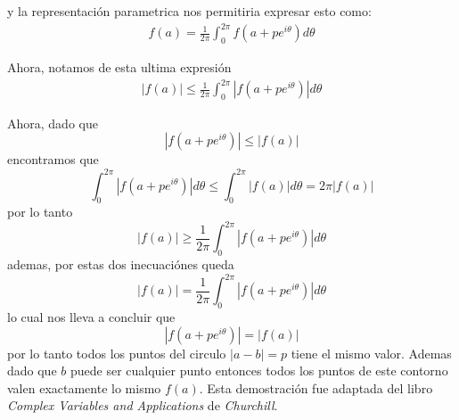 \documentclass[12pt]{exam}
\begin{document}
y la representación parametrica nos permitiria expresar esto como:
\begin{align*}
	f(a) = \frac{1}{2\pi}\int_0^{2\pi}f(a + pe^{i\theta})d\theta
\end{align*}

Ahora, notamos de esta ultima expresión
\begin{align*}
	|f(a)|\le \frac{1}{2\pi}\int_{0}^{2\pi}|f(a+pe^{i\theta})| d\theta
\end{align*}

Ahora, dado que $$|f(a+pe^{i\theta})|\le|f(a)|$$ encontramos que $$\int_0^{2\pi}|f(a + pe^{i\theta})|d\theta \le \int_0^{2\pi}|f(a)|d\theta=2\pi |f(a)|$$ por lo tanto $$|f(a)|\ge\frac{1}{2\pi}\int_0^{2\pi}|f(a+pe^{i\theta})|d\theta$$ ademas, por estas dos inecuaciónes queda $$|f(a)| = \frac{1}{2\pi}\int_0^{2\pi} |f(a + pe^{i\theta})|d\theta$$ lo cual nos lleva a concluir que $$|f(a+pe^{i\theta})|=|f(a)|$$ por lo tanto todos los puntos del circulo $|a - b| = p$ tiene el mismo valor. Ademas dado que $b$ puede ser cualquier punto entonces todos los puntos de este contorno valen exactamente lo mismo $f(a)$. Esta demostración fue adaptada del libro \textit{Complex Variables and Applications} de \textit{Churchill}.
\end{document}
